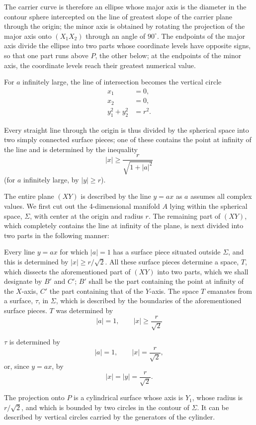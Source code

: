 \documentclass{article}
\begin{document}
The carrier curve is therefore an ellipse whose major axis is the diameter in the contour sphere intercepted on the line of greatest slope of the carrier plane through the origin; the minor axis is obtained by rotating the projection of the major axis onto $(X_1 X_2)$ through an angle of $90^\circ$. The endpoints of the major axis divide the ellipse into two parts whose coordinate levels have opposite signs, so that one part runs above $P$, the other below; at the endpoints of the minor axis, the coordinate levels reach their greatest numerical value.

For $a$ infinitely large, the line of intersection becomes the vertical circle
\[
\begin{aligned}
x_1 &= 0, \\
x_2 &= 0, \\
y_1^2 + y_2^2 &= r^2.
\end{aligned}
\]

Every straight line through the origin is thus divided by the spherical space into two simply connected surface pieces; one of these contains the point at infinity of the line and is determined by the inequality
\[
|x| \ge \frac{r}{\sqrt{1 + |a|^2}}
\]
(for $a$ infinitely large, by $|y| \ge r$).

The entire plane $(XY)$ is described by the line $y = ax$ as $a$ assumes all complex values. We first cut out the 4-dimensional manifold $A$ lying within the spherical space, $\Sigma$, with center at the origin and radius $r$. The remaining part of $(XY)$, which completely contains the line at infinity of the plane, is next divided into two parts in the following manner:

Every line $y = ax$ for which $|a| = 1$ has a surface piece situated outside $\Sigma$, and this is determined by $|x| \ge r / \sqrt{2}$. All these surface pieces determine a space, $T$, which dissects the aforementioned part of $(XY)$ into two parts, which we shall designate by $B'$ and $C'$; $B'$ shall be the part containing the point at infinity of the $X$-axis, $C'$ the part containing that of the $Y$-axis. The space $T$ emanates from a surface, $\tau$, in $\Sigma$, which is described by the boundaries of the aforementioned surface pieces. $T$ was determined by
\[
|a| = 1, \qquad |x| \ge \frac{r}{\sqrt{2}}
\]

$\tau$ is determined by
\[
|a| = 1, \qquad |x| = \frac{r}{\sqrt{2}},
\]
or, since $y = ax$, by
\[
|x| = |y| = \frac{r}{\sqrt{2}}.
\]

The projection onto $P$ is a cylindrical surface whose axis is $Y_1$, whose radius is $r / \sqrt{2}$, and which is bounded by two circles in the contour of $\Sigma$. It can be described by vertical circles carried by the generators of the cylinder.
\end{document}
